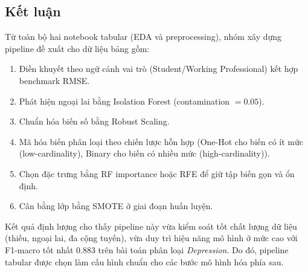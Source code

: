 \subsection{Kết luận}
Từ toàn bộ hai notebook tabular (EDA và preprocessing), nhóm xây dựng pipeline đề xuất cho dữ liệu bảng gồm:
\begin{enumerate}
    \item Điền khuyết theo ngữ cảnh vai trò (Student/Working Professional) kết hợp benchmark RMSE.
    \item Phát hiện ngoại lai bằng Isolation Forest (contamination $=0.05$).
    \item Chuẩn hóa biến số bằng Robust Scaling.
    \item Mã hóa biến phân loại theo chiến lược hỗn hợp (One-Hot cho biến có ít mức (low-cardinality), Binary cho biến có nhiều mức (high-cardinality)).
    \item Chọn đặc trưng bằng RF importance hoặc RFE để giữ tập biến gọn và ổn định.
    \item Cân bằng lớp bằng SMOTE ở giai đoạn huấn luyện.
\end{enumerate}

Kết quả định lượng cho thấy pipeline này vừa kiểm soát tốt chất lượng dữ liệu (thiếu, ngoại lai, đa cộng tuyến), vừa duy trì hiệu năng mô hình ở mức cao với F1-macro tốt nhất 0.883 trên bài toán phân loại \textit{Depression}. Do đó, pipeline tabular được chọn làm cấu hình chuẩn cho các bước mô hình hóa phía sau.
